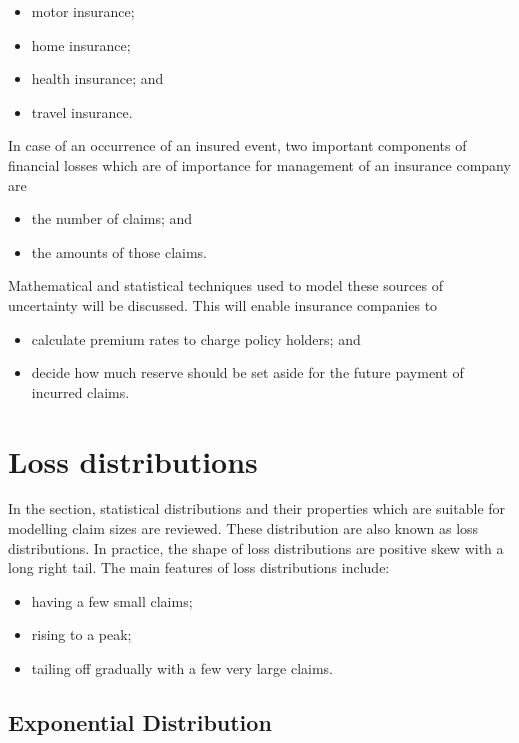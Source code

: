 \documentclass[
]{book}
\theoremstyle{definition}
\theoremstyle{definition}
\theoremstyle{definition}
\theoremstyle{definition}
\theoremstyle{remark}
\begin{document}
\begin{itemize}
\item
  motor insurance;
\item
  home insurance;
\item
  health insurance; and
\item
  travel insurance.
\end{itemize}

In case of an occurrence of an insured event, two important components
of financial losses which are of importance for management of an
insurance company are

\begin{itemize}
\item
  the number of claims; and
\item
  the amounts of those claims.
\end{itemize}

Mathematical and statistical techniques used to model these sources of
uncertainty will be discussed. This will enable insurance companies to

\begin{itemize}
\item
  calculate premium rates to charge policy holders; and
\item
  decide how much reserve should be set aside for the future payment
  of incurred claims.
\end{itemize}

\hypertarget{loss-distributions}{%
\chapter{Loss distributions}\label{loss-distributions}}

In the section, statistical distributions and their properties which are
suitable for modelling claim sizes are reviewed. These distribution are
also known as loss distributions. In practice, the shape of loss
distributions are positive skew with a long right tail. The main
features of loss distributions include:

\begin{itemize}
\item
  having a few small claims;
\item
  rising to a peak;
\item
  tailing off gradually with a few very large claims.
\end{itemize}

\hypertarget{exponential-distribution}{%
\section{Exponential Distribution}\label{exponential-distribution}}
\end{document}
